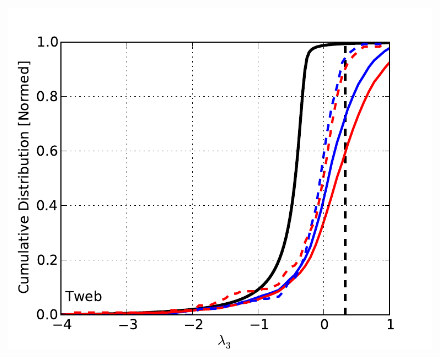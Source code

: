 \documentclass[usenatbib]{latex/mn2e}
\begin{document}
\begin{flushleft}
\begin{figure}
\begin{center}
  \includegraphics[trim = 3mm 0mm 10mm 8mm, clip, keepaspectratio=true,
  width=0.24\textheight]{./figures/eigen3_dist_Tweb}


\end{center}
\end{figure}
\end{flushleft}
\end{document}
